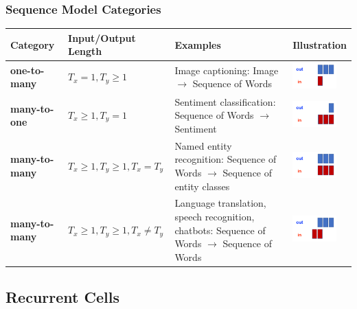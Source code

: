 \documentclass[11pt]{article}
\begin{document}
\subsubsection{Sequence Model Categories}
\begin{tabularx}{\linewidth}{l l X l}
	Category & Input/Output Length & Examples & Illustration\\
	\hline
	\textbf{one-to-many} & $T_x = 1, T_y \geq 1$ & Image captioning: Image $\rightarrow$ Sequence of Words & \includegraphics[height=1cm]{img/sequence_model_onetomany}\\
	\hline
	\textbf{many-to-one} & $T_x \geq 1, T_y = 1$ & Sentiment classification: Sequence of Words $\rightarrow$ Sentiment & \includegraphics[height=1cm]{img/sequence_model_manytoone}\\
	\hline
	\textbf{many-to-many} & $T_x \geq 1, T_y \geq 1, T_x = T_y$ & Named entity recognition: Sequence of Words $\rightarrow$ Sequence of entity classes & \includegraphics[height=1cm]{img/sequence_model_manytomany}\\
	\hline
	\textbf{many-to-many} & $T_x \geq 1, T_y \geq 1, T_x \neq T_y$ & Language translation, speech recognition, chatbots: Sequence of Words $\rightarrow$ Sequence of Words & \includegraphics[height=1cm]{img/sequence_model_manytomany2}\\
	\hline
\end{tabularx}

\newpage
\subsection{Recurrent Cells}
\end{document}

